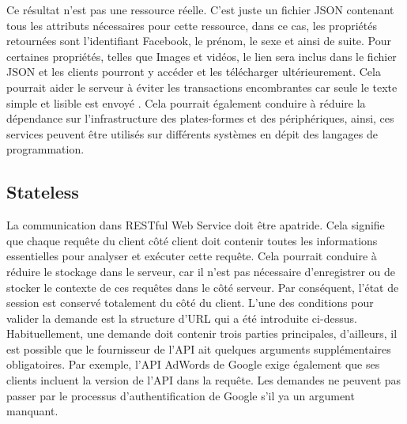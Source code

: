 Ce résultat n'est pas une ressource réelle. C'est juste un fichier JSON contenant tous les attributs nécessaires pour cette ressource, dans ce cas, les propriétés retournées sont l'identifiant Facebook, le prénom, le sexe et ainsi de suite. Pour certaines propriétés, telles que Images et vidéos, le lien sera inclus dans le fichier JSON et les clients pourront y accéder et les télécharger ultérieurement. Cela pourrait aider le serveur à éviter les transactions encombrantes car seule le texte simple et lisible est envoyé . Cela pourrait également conduire à réduire la dépendance sur l'infrastructure des plates-formes et des périphériques, ainsi, ces services peuvent être utilisés sur différents systèmes en dépit des langages de programmation.

\subsection{Stateless}

La communication dans RESTful Web Service doit être apatride. Cela signifie que chaque requête du client côté client doit contenir toutes les informations essentielles pour analyser et exécuter cette requête. Cela pourrait conduire à réduire le stockage dans le serveur, car il n'est pas nécessaire d'enregistrer ou de stocker le contexte de ces requêtes dans le côté serveur. Par conséquent, l'état de session est conservé totalement du côté du client. L'une des conditions pour valider la demande est la structure d'URL qui a été introduite ci-dessus. Habituellement, une demande doit contenir trois parties principales, d'ailleurs, il est possible que le fournisseur de l'API ait quelques arguments supplémentaires obligatoires. Par exemple, l'API AdWords de Google exige également que ses clients incluent la version de l'API dans la requête. Les demandes ne peuvent pas passer par le processus d'authentification de Google s'il ya un argument manquant.

